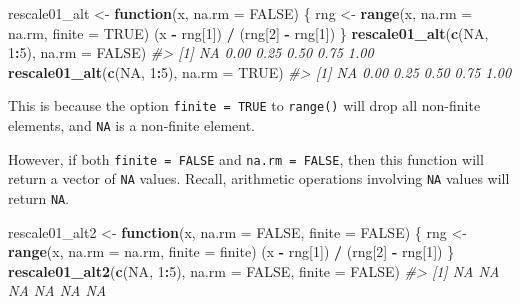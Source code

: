 \documentclass[]{book}
\newenvironment{Shaded}{\begin{snugshade}}{\end{snugshade}}
\newcommand{\CommentTok}[1]{\textcolor[rgb]{0.56,0.35,0.01}{\textit{#1}}}
\newcommand{\ControlFlowTok}[1]{\textcolor[rgb]{0.13,0.29,0.53}{\textbf{#1}}}
\newcommand{\DataTypeTok}[1]{\textcolor[rgb]{0.13,0.29,0.53}{#1}}
\newcommand{\DecValTok}[1]{\textcolor[rgb]{0.00,0.00,0.81}{#1}}
\newcommand{\KeywordTok}[1]{\textcolor[rgb]{0.13,0.29,0.53}{\textbf{#1}}}
\newcommand{\NormalTok}[1]{#1}
\newcommand{\OperatorTok}[1]{\textcolor[rgb]{0.81,0.36,0.00}{\textbf{#1}}}
\newcommand{\OtherTok}[1]{\textcolor[rgb]{0.56,0.35,0.01}{#1}}
\newcommand{\StringTok}[1]{\textcolor[rgb]{0.31,0.60,0.02}{#1}}
\theoremstyle{plain}
\theoremstyle{remark}
\begin{document}
\begin{Shaded}
\begin{Highlighting}[]
\NormalTok{rescale01_alt <-}\StringTok{ }\ControlFlowTok{function}\NormalTok{(x, }\DataTypeTok{na.rm =} \OtherTok{FALSE}\NormalTok{) \{}
\NormalTok{  rng <-}\StringTok{ }\KeywordTok{range}\NormalTok{(x, }\DataTypeTok{na.rm =}\NormalTok{ na.rm, }\DataTypeTok{finite =} \OtherTok{TRUE}\NormalTok{)}
\NormalTok{  (x }\OperatorTok{-}\StringTok{ }\NormalTok{rng[}\DecValTok{1}\NormalTok{]) }\OperatorTok{/}\StringTok{ }\NormalTok{(rng[}\DecValTok{2}\NormalTok{] }\OperatorTok{-}\StringTok{ }\NormalTok{rng[}\DecValTok{1}\NormalTok{])}
\NormalTok{\}}
\KeywordTok{rescale01_alt}\NormalTok{(}\KeywordTok{c}\NormalTok{(}\OtherTok{NA}\NormalTok{, }\DecValTok{1}\OperatorTok{:}\DecValTok{5}\NormalTok{), }\DataTypeTok{na.rm =} \OtherTok{FALSE}\NormalTok{)}
\CommentTok{#> [1]   NA 0.00 0.25 0.50 0.75 1.00}
\KeywordTok{rescale01_alt}\NormalTok{(}\KeywordTok{c}\NormalTok{(}\OtherTok{NA}\NormalTok{, }\DecValTok{1}\OperatorTok{:}\DecValTok{5}\NormalTok{), }\DataTypeTok{na.rm =} \OtherTok{TRUE}\NormalTok{)}
\CommentTok{#> [1]   NA 0.00 0.25 0.50 0.75 1.00}
\end{Highlighting}
\end{Shaded}

This is because the option \texttt{finite\ =\ TRUE} to \texttt{range()} will drop all non-finite
elements, and \texttt{NA} is a non-finite element.

However, if both \texttt{finite\ =\ FALSE} and \texttt{na.rm\ =\ FALSE}, then this function will
return a vector of \texttt{NA} values.
Recall, arithmetic operations involving \texttt{NA} values will return \texttt{NA}.

\begin{Shaded}
\begin{Highlighting}[]
\NormalTok{rescale01_alt2 <-}\StringTok{ }\ControlFlowTok{function}\NormalTok{(x, }\DataTypeTok{na.rm =} \OtherTok{FALSE}\NormalTok{, }\DataTypeTok{finite =} \OtherTok{FALSE}\NormalTok{) \{}
\NormalTok{  rng <-}\StringTok{ }\KeywordTok{range}\NormalTok{(x, }\DataTypeTok{na.rm =}\NormalTok{ na.rm, }\DataTypeTok{finite =}\NormalTok{ finite)}
\NormalTok{  (x }\OperatorTok{-}\StringTok{ }\NormalTok{rng[}\DecValTok{1}\NormalTok{]) }\OperatorTok{/}\StringTok{ }\NormalTok{(rng[}\DecValTok{2}\NormalTok{] }\OperatorTok{-}\StringTok{ }\NormalTok{rng[}\DecValTok{1}\NormalTok{])}
\NormalTok{\}}
\KeywordTok{rescale01_alt2}\NormalTok{(}\KeywordTok{c}\NormalTok{(}\OtherTok{NA}\NormalTok{, }\DecValTok{1}\OperatorTok{:}\DecValTok{5}\NormalTok{), }\DataTypeTok{na.rm =} \OtherTok{FALSE}\NormalTok{, }\DataTypeTok{finite =} \OtherTok{FALSE}\NormalTok{)}
\CommentTok{#> [1] NA NA NA NA NA NA}
\end{Highlighting}
\end{Shaded}
\end{document}

